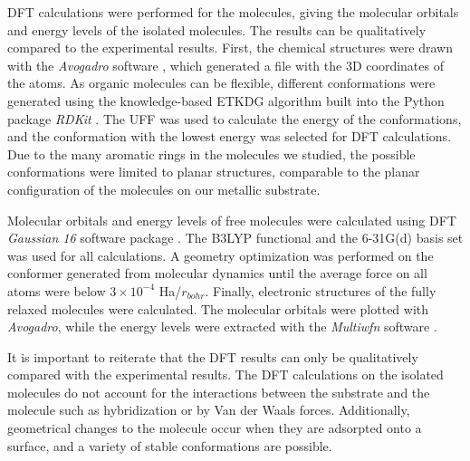 \Acf{DFT} calculations were performed for the molecules, giving the molecular orbitals and energy levels of the isolated molecules. The results can be qualitatively compared to the experimental results. First, the chemical structures were drawn with the \textit{Avogadro} software \citep{hanwell2012avogadro}, which generated a file with the \ac{3D} coordinates of the atoms. As organic molecules can be flexible, different conformations were generated using the knowledge-based \ac{ETKDG} algorithm \citep{riniker2015better} built into the Python package \textit{RDKit} \citep{rdkit}. The \ac{UFF} \citep{rappe1992uff} was used to calculate the energy of the conformations, and the conformation with the lowest energy was selected for \ac{DFT} calculations. Due to the many aromatic rings in the molecules we studied, the possible conformations were limited to planar structures, comparable to the planar configuration of the molecules on our metallic substrate.

Molecular orbitals and energy levels of free molecules were calculated using \ac{DFT} \emph{Gaussian 16} software package \citep{frisch2016gaussian}. The \ac{B3LYP} functional \citep{lee1988development,becke1993becke} and the 6-31G(d) \citep{frisch1984self} basis set was used for all calculations. A geometry optimization was performed on the conformer generated from molecular dynamics until the average force on all atoms were below $3\times 10^{-4}$ Ha/$r_{bohr}$. Finally, electronic structures of the fully relaxed molecules were calculated. The molecular orbitals were plotted with \textit{Avogadro}, while the energy levels were extracted with the \textit{Multiwfn} software \citep{lu2012multiwfn}. 

It is important to reiterate that the \ac{DFT} results can only be qualitatively compared with the experimental results. The \ac{DFT} calculations on the isolated molecules do not account for the interactions between the substrate and the molecule such as hybridization or by Van der Waals forces. Additionally, geometrical changes to the molecule occur when they are adsorpted onto a surface, and a variety of stable conformations are possible.

